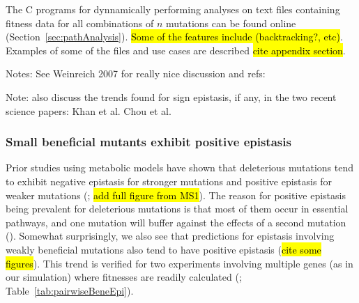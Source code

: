 The C programs for dynnamically performing analyses on text files
containing fitness data for all combinations of $n$ mutations
can be found online (\suppOrApp Section~\ref{sec:pathAnalysis}).
\hl{Some of the features include (backtracking?, etc)}.  Examples of
some of the files and use cases are described \hl{cite appendix
section}.

Notes: See Weinreich 2007 for really nice discussion and refs:

Note: also discuss the trends found for sign epistasis, if any, in the two recent science papers:
Khan et al.
Chou et al.

\subsubsection{Small beneficial mutants exhibit positive epistasis}

Prior studies using metabolic models have shown that deleterious
mutations tend to exhibit negative epistasis for stronger mutations
and positive epistasis for weaker mutations (\citep{He2010, Xu2012};
\hl{add full figure from MS1}). The reason for positive epistasis
being prevalent for deleterious mutations is that most of them occur
in essential pathways, and one mutation will buffer against the
effects of a second mutation (\citep{Xu2012}). Somewhat surprisingly,
we also see that predictions for epistasis involving weakly beneficial
mutations also tend to have positive epistasis (\hl{cite some
figures}). This trend is verified for two experiments involving
multiple genes (as in our simulation) where fitnesses are readily
calculated (\citep{Chou2011, Khan2011}; Table~\ref{tab:pairwiseBeneEpi}).

